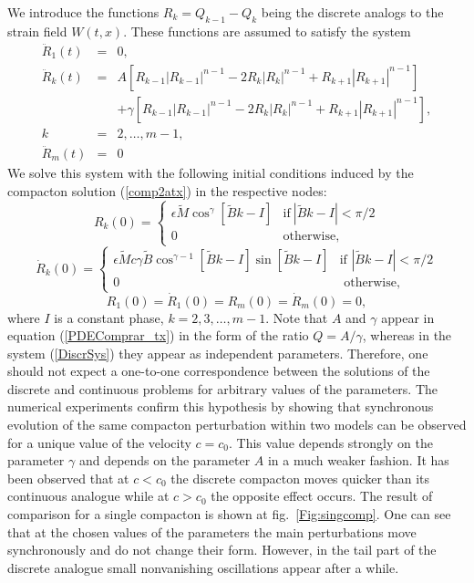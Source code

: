 \documentclass[12pt]{article}
\begin{document}
\noindent
We introduce the functions $R_k=Q_{k-1}-Q_k$ being the discrete analogs to the strain field $W(t, x)$. These functions are assumed to satisfy the system
\begin{equation}\label{DiscrSys}
\begin{array}{rcl}
\ddot R_1(t)&=&0, \\
\ddot R_k(t)&=&A\left[ R_{k-1} |R_{k-1}|^{n-1}-2 R_{k} |R_{k}|^{n-1}+R_{k+1} |R_{k+1}|^{n-1} \right]\\[2mm]
&&+\gamma \left[ R_{k-1} |R_{k-1}|^{n-1}-2 R_{k} |R_{k}|^{n-1}+R_{k+1} |R_{k+1}|^{n-1} \right],\\[2mm]
k&=&2,\dots,m-1, \\
\ddot R_m(t)&=&0
\end{array}
\end{equation}
We solve this system with the following initial conditions induced by the compacton solution (\ref{comp2atx}) in the respective nodes:
\begin{equation}\label{discrinit}
R_k(0) = \begin{cases}   \epsilon \tilde M \cos^\gamma [ \tilde B   k-I]  & \mbox{if}\ |\tilde B   k-I|<\pi/2  \\
0 & \mbox{otherwise},  \end{cases}
\end{equation}
\begin{equation}\label{primdiscrinit}
\dot R_k(0) = \begin{cases}    \epsilon \tilde M c \gamma \tilde B \cos^{\gamma-1} [ \tilde B   k-I]\sin[ \tilde B    k- I]  &\mbox{if } |\tilde B k-I|<\pi/2  \\
0 & \mbox{  otherwise},  \end{cases}
\end{equation}
\begin{equation}
R_1(0)=\dot R_1(0)=R_m(0)=\dot R_m(0)=0,
\end{equation}
where $I$ is a constant phase, $k=2,3,\dots,m-1$.
Note that  $A$ and $\gamma$  appear in equation (\ref{PDEComprar_tx}) in the form of the  ratio $Q=A/\gamma$, whereas in the system (\ref{DiscrSys})
they appear as independent parameters. Therefore, one
should not expect a one-to-one correspondence between the solutions of the discrete and continuous problems for arbitrary values of the
parameters. The numerical experiments confirm this hypothesis by showing that synchronous evolution of the
same compacton perturbation within two models can be observed for a unique value of the velocity
$c=c_{0}$. This value depends strongly on the parameter $\gamma$ and depends on the parameter $A$ in a much weaker fashion.  It has been observed that at $c<c_0$ the discrete compacton moves
quicker than its continuous analogue while at $c>c_0$  the opposite effect occurs.
The result of comparison for a single compacton is shown at fig.~\ref{Fig:singcomp}. One  can see
that at the chosen values of the parameters the main perturbations  move synchronously and do not
change their form. However, in the tail part of the  discrete analogue small nonvanishing oscillations appear after a while.
\end{document}
